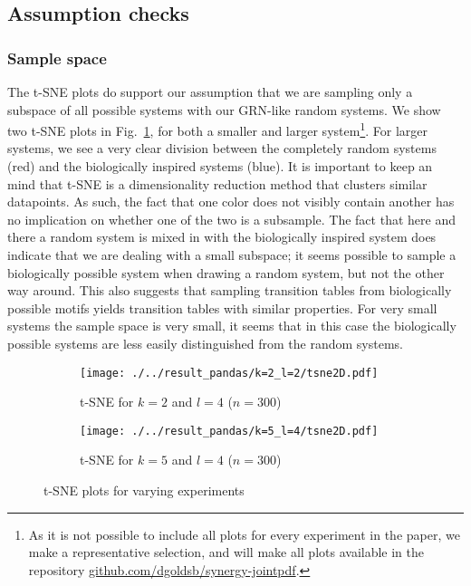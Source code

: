 \documentclass[../main.tex]{subfiles}
\begin{document}
\subsection{Assumption checks}

\subsubsection{Sample space}

The t-SNE plots do support our assumption that we are sampling only a subspace of all possible systems with our GRN-like random systems.
We show two t-SNE plots in Fig.~\ref{fig:TSNE}, for both a smaller and larger system\footnote{As it is not possible to include all plots for every experiment in the paper, we make a representative selection, and will make all plots available in the repository \url{github.com/dgoldsb/synergy-jointpdf}.}.
For larger systems, we see a very clear division between the completely random systems (red) and the biologically inspired systems (blue).
It is important to keep an mind that t-SNE is a dimensionality reduction method that clusters similar datapoints.
As such, the fact that one color does not visibly contain another has no implication on whether one of the two is a subsample.
The fact that here and there a random system is mixed in with the biologically inspired system does indicate that we are dealing with a small subspace; it seems possible to sample a biologically possible system when drawing a random system, but not the other way around.
This also suggests that sampling transition tables from biologically possible motifs yields transition tables with similar properties.
For very small systems the sample space is very small, it seems that in this case the biologically possible systems are less easily distinguished from the random systems.

\begin{figure}[ht]
    \centering
    \begin{subfigure}[b]{0.4\textwidth}
        \texttt{[image: ./../result\_pandas/k=2\_l=2/tsne2D.pdf]}
        \caption{t-SNE for $k=2$ and $l=4$ ($n=300$)}
    \end{subfigure}
    \begin{subfigure}[b]{0.4\textwidth}
        \texttt{[image: ./../result\_pandas/k=5\_l=4/tsne2D.pdf]}
        \caption{t-SNE for $k=5$ and $l=4$ ($n=300$)}
    \end{subfigure}
    \caption{t-SNE plots for varying experiments}
    \label{fig:TSNE}
\end{figure}
\end{document}
